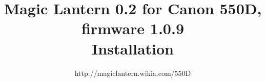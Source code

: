 \documentclass{article}
\begin{document}
\title{Magic Lantern 0.2 for Canon 550D, firmware 1.0.9\\Installation}
\author{http://magiclantern.wikia.com/550D}
\maketitle
\vspace{-10mm}
{
\renewcommand{\baselinestretch}{0.9}
\tableofcontents
}
\newpage

\end{document}

